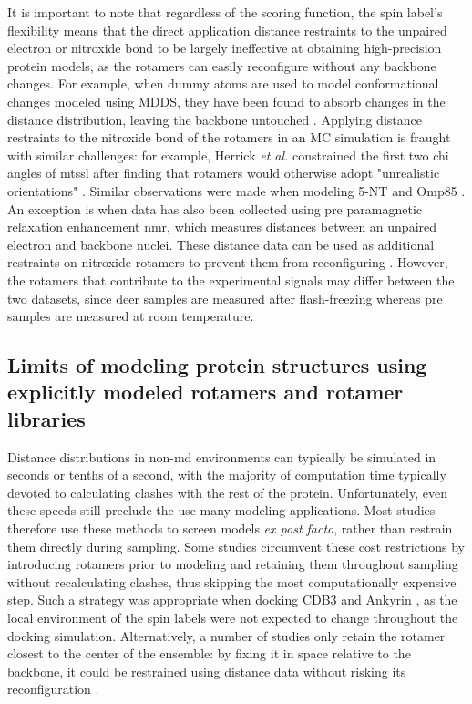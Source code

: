 It is important to note that regardless of the scoring function, the spin label's flexibility means that the direct application distance restraints to the unpaired electron or nitroxide bond to be largely ineffective at obtaining high-precision protein models, as the rotamers can easily reconfigure without any backbone changes. For example, when dummy atoms are used to model conformational changes modeled using MDDS, they have been found to absorb changes in the distance distribution, leaving the backbone untouched \citep*{Kazmier2014a, Raghuraman2014}. Applying distance restraints to the nitroxide bond of the rotamers in an MC simulation is fraught with similar challenges: for example, Herrick \emph{et al.} constrained the first two chi angles of \gls{mtssl} after finding that rotamers would otherwise adopt "unrealistic orientations" \citep*{Herrick2009, Lai2011}. Similar observations were made when modeling 5-NT \citep*{Krug2016} and Omp85 \citep*{Dastvan2016}. An exception is when data has also been collected using \gls{pre} paramagnetic relaxation enhancement \gls{nmr}, which measures distances between an unpaired electron and backbone nuclei. These distance data can be used as additional restraints on nitroxide rotamers to prevent them from reconfiguring \citep*{Milikisiyants2017, Saio2021, Wu2013}. However, the rotamers that contribute to the experimental signals may differ between the two datasets, since \gls{deer} samples are measured after flash-freezing whereas \gls{pre} samples are measured at room temperature.

\subsection{Limits of modeling protein structures using explicitly modeled rotamers and rotamer libraries}

Distance distributions in non-\gls{md} environments can typically be simulated in seconds or tenths of a second, with the majority of computation time typically devoted to calculating clashes with the rest of the protein. Unfortunately, even these speeds still preclude the use many modeling applications. Most studies therefore use these methods to screen models \emph{ex post facto}, rather than restrain them directly during sampling. Some studies circumvent these cost restrictions by introducing rotamers prior to modeling and retaining them throughout sampling without recalculating clashes, thus skipping the most computationally expensive step. Such a strategy was appropriate when docking CDB3 and Ankyrin \citep*{Edwards2014}, as the local environment of the spin labels were not expected to change throughout the docking simulation. Alternatively, a number of studies only retain the rotamer closest to the center of the ensemble: by fixing it in space relative to the backbone, it could be restrained using distance data without risking its reconfiguration \citep*{Bibow2017, Duss2014, Duss2014a, Raba2014,  Ward2009}.


